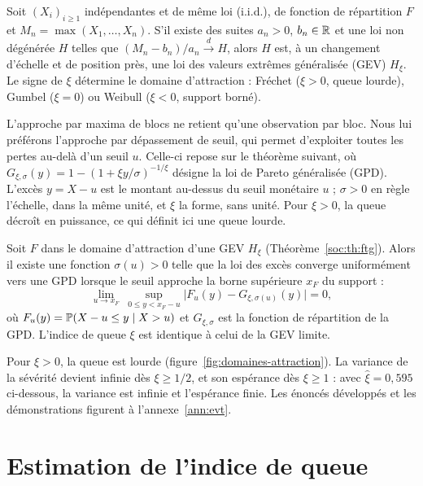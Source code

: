 \begin{theorem}\label{soc:th:ftg}
Soit $(X_i)_{i\ge1}$ indépendantes et de même loi (i.i.d.), de fonction de répartition $F$ et $M_n=\max(X_1,\dots,X_n)$. S'il existe des suites $a_n>0$, $b_n\in\mathbb{R}$ et une loi non dégénérée $H$ telles que $(M_n-b_n)/a_n \xrightarrow{d} H$, alors $H$ est, à un changement d'échelle et de position près, une loi des valeurs extrêmes généralisée (GEV) $H_\xi$. Le signe de $\xi$ détermine le domaine d'attraction : Fréchet ($\xi>0$, queue lourde), Gumbel ($\xi=0$) ou Weibull ($\xi<0$, support borné).
\end{theorem}

\noindent L'approche par maxima de blocs ne retient qu'une observation par bloc. Nous lui
préférons l'approche par dépassement de seuil, qui permet d'exploiter toutes les pertes au-delà d'un
seuil $u$. Celle-ci repose sur le théorème suivant, où
$G_{\xi,\sigma}(y)=1-\left(1+\xi y/\sigma\right)^{-1/\xi}$ désigne la loi de Pareto
généralisée (GPD). L'excès $y=X-u$ est le montant au-dessus du seuil monétaire $u$ ; $\sigma>0$ en règle l'échelle, dans la même unité, et $\xi$ la forme, sans unité. Pour $\xi>0$, la queue décroît en puissance, ce qui définit ici une queue lourde.

\begin{theorem}\label{soc:th:balkema}
Soit $F$ dans le domaine d'attraction d'une GEV $H_\xi$ (Théorème~\ref{soc:th:ftg}). Alors il existe une fonction $\sigma(u)>0$ telle que la loi des excès converge uniformément vers une GPD lorsque le seuil approche la borne supérieure $x_F$ du support :
\begin{equation}
\lim_{u\to x_F}\ \sup_{0\le y< x_F-u}\bigl|F_u(y)-G_{\xi,\sigma(u)}(y)\bigr|=0,
\end{equation}
où $F_u(y)=\mathbb{P}(X-u\le y\mid X>u)$ et $G_{\xi,\sigma}$ est la fonction de répartition de la GPD. L'indice de queue $\xi$ est identique à celui de la GEV limite.
\end{theorem}

\noindent Pour $\xi>0$, la queue est lourde (figure~\ref{fig:domaines-attraction}). La variance de la
sévérité devient infinie dès $\xi\ge 1/2$, et son espérance dès $\xi\ge 1$ \citep{mcneil2015} :
avec $\hat\xi=0{,}595$ ci-dessous, la variance est infinie et l'espérance finie. Les énoncés développés
et les démonstrations figurent à l'annexe~\ref{ann:evt}.

\section{Estimation de l'indice de queue}

